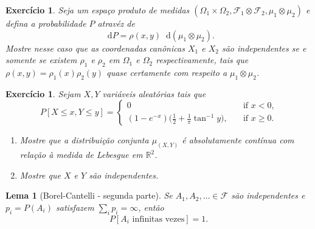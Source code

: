 \documentclass[reqno, final]{book}
\newcommand*\1{\mathds{1}}
\newtheorem{lemma}[theorem]{Lema}
\newtheorem{exercise}[example]{Exercício}
\renewcommand*\d{\mathop{}\!\mathrm{d}}
\begin{document}
\begin{exercise}
  Seja um espaço produto de medidas $(\Omega_1 \times \Omega_2, \mathcal{F}_1 \otimes \mathcal{F}_2, \mu_1 \otimes \mu_2)$ e defina a probabilidade $P$ atravéz de
  \begin{equation}
    \d P = \rho(x,y) \d (\mu_1 \otimes \mu_2).
  \end{equation}
  Mostre nesse caso que as coordenadas canônicas $X_1$ e $X_2$ são independentes se e somente se existem $\rho_1$ e $\rho_2$ em $\Omega_1$ e $\Omega_2$ respectivamente, tais que $\rho(x,y) = \rho_1(x) \rho_2(y)$ quase certamente com respeito a $\mu_1 \otimes \mu_2$.
\end{exercise}

\begin{exercise}
  Sejam $X, Y$ vari\'aveis aleat\'orias tais que
  \begin{equation}
    P[X \leq x, Y \leq y] =
    \begin{cases}
      0 & \quad \text{if $x < 0$,}\\
      (1-e^{-x}) \Big(\frac 12 + \frac 1\pi \tan^{-1} y \Big), & \quad \text{if $x \geq 0$}.
    \end{cases}
  \end{equation}
  \begin{enumerate}[\quad a)]
  \item Mostre que a distribui\c{c}\~ao conjunta $\mu_{(X,Y)}$ \'e
    absolutamente cont\'inua com rela\c{c}\~ao \`a medida de Lebesgue em
    $\mathbb{R}^2$.
  \item Mostre que $X$ e $Y$ s\~ao independentes.
  \end{enumerate}
\end{exercise}


\begin{lemma}[Borel-Cantelli - segunda parte]
  Se $A_1, A_2, \dots \in \mathcal{F}$ são independentes e $p_i = P(A_i)$ satisfazem $\sum_i p_i = \infty$, então
  \begin{equation}
    P[A_i \text{ infinitas vezes}] = 1.
  \end{equation}
\end{lemma}
\end{document}
